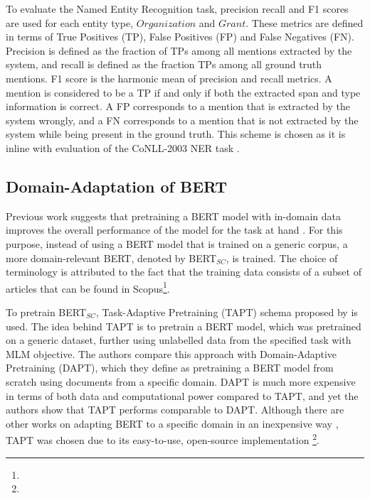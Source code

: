\documentclass{article}
\theoremstyle{definition}
\theoremstyle{remark}
\begin{document}
To evaluate the Named Entity Recognition task, precision recall and F1 scores are used for each entity type, $Organization$ and $Grant$. These metrics are defined in terms of True Positives (TP), False Positives (FP) and False Negatives (FN). Precision is defined as the fraction of TPs among all mentions extracted by the system, and recall is defined as the fraction TPs among all ground truth mentions. F1 score is the harmonic mean of precision and recall metrics. A mention is considered to be a TP if and only if both the extracted span and type information is correct. A FP corresponds to a mention that is extracted by the system wrongly, and a FN corresponds to a mention that is not extracted by the system while being present in the ground truth. This scheme is chosen as it is inline with evaluation of the CoNLL-2003 NER task \cite{conll}.


\subsection{Domain-Adaptation of BERT}
\label{sec:exSetPretrain}
Previous work suggests that pretraining a BERT model with in-domain data improves the overall performance of the model for the task at hand \textcolor{red}{\cite{}}. For this purpose, instead of using a BERT model that is trained on a generic corpus, a more domain-relevant BERT, denoted by BERT$_{SC}$, is trained. The choice of terminology is attributed to the fact that the training data consists of a subset of articles that can be found in Scopus\textcolor{red}{\footnote{}}.

To pretrain BERT$_{SC}$, Task-Adaptive Pretraining (TAPT) schema proposed by \cite{DontStop} is used. The idea behind TAPT is to pretrain a BERT model, which was pretrained on a generic dataset, further using unlabelled data from the specified task with MLM objective. The authors compare this approach with Domain-Adaptive Pretraining (DAPT), which they define as pretraining a BERT model from scratch using documents from a specific domain. DAPT is much more expensive in terms of both data and computational power compared to TAPT, and yet the authors show that TAPT performs comparable to DAPT. Although there are other works on adapting BERT to a specific domain in an inexpensive way \textcolor{red}{\cite{}}, TAPT was chosen due to its easy-to-use, open-source implementation \textcolor{red}{\footnote{}}.
\end{document}
